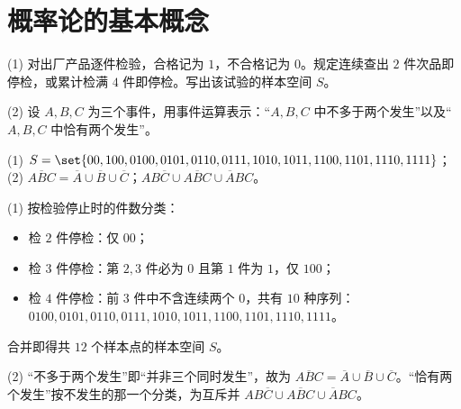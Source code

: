 %
%
\section{概率论的基本概念}

\begin{exercise}[title={样本空间与事件表达},level=basic,points=6,tags={样本空间,事件运算}]
(1) 对出厂产品逐件检验，合格记为 $1$，不合格记为 $0$。规定连续查出 $2$ 件次品即停检，或累计检满 $4$ 件即停检。写出该试验的样本空间 $S$。

(2) 设 $A,B,C$ 为三个事件，用事件运算表示：“$A,B,C$ 中不多于两个发生”以及“$A,B,C$ 中恰有两个发生”。
\begin{answer}
(1) $S=\set{00,100,0100,0101,0110,0111,1010,1011,1100,1101,1110,1111}$；
(2) $\overline{ABC}=\overline{A}\cup\overline{B}\cup\overline{C}$；$AB\overline{C}\cup A\overline{B}C\cup\overline{A}BC$。
\end{answer}
\begin{solution}
(1) 按检验停止时的件数分类：
\begin{itemize}
  \item 检 $2$ 件停检：仅 $00$；
  \item 检 $3$ 件停检：第 $2,3$ 件必为 $0$ 且第 $1$ 件为 $1$，仅 $100$；
  \item 检 $4$ 件停检：前 $3$ 件中不含连续两个 $0$，共有 $10$ 种序列：$0100,0101,0110,0111,1010,1011,1100,1101,1110,1111$。
\end{itemize}
合并即得共 $12$ 个样本点的样本空间 $S$。

(2) “不多于两个发生”即“并非三个同时发生”，故为 $\overline{ABC}=\overline{A}\cup\overline{B}\cup\overline{C}$。“恰有两个发生”按不发生的那一个分类，为互斥并 $AB\overline{C}\cup A\overline{B}C\cup\overline{A}BC$。
\end{solution}
\end{exercise}

